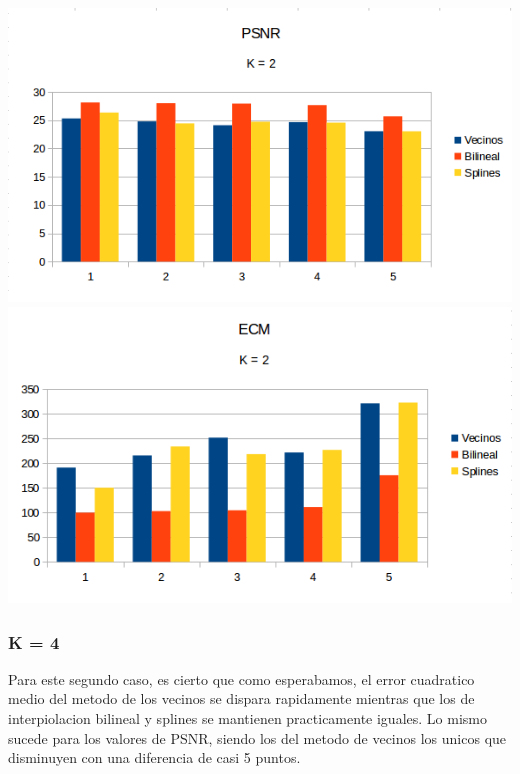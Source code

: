 \begin{center}
\includegraphics[scale=0.50]{imagenes/K2PSNR.png}
\includegraphics[scale=0.50]{imagenes/K2ECM.png}
\end{center}

\subsubsection{K = 4}
Para este segundo caso, es cierto que como esperabamos, el error cuadratico medio del metodo de los vecinos se dispara rapidamente mientras que los de interpiolacion bilineal y splines se mantienen practicamente iguales. Lo mismo sucede para los valores de PSNR, siendo los del metodo de vecinos los unicos que disminuyen con una diferencia de casi 5 puntos.

